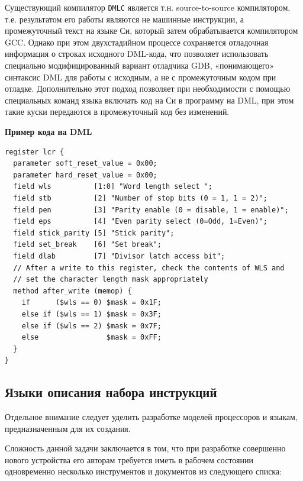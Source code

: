 Существующий компилятор \texttt{DMLC} является т.н. source-to-source компилятором, т.е. результатом его работы являются не машинные инструкции, а промежуточный текст на языке Си, который затем обрабатывается компилятором GCC. Однако при этом двухстадийном процессе сохраняется отладочная информация о строках исходного DML-кода, что позволяет использовать специально модифицированный вариант отладчика GDB, «понимающего» синтаксис DML для работы с исходным, а не с промежуточным кодом при отладке. Дополнительно этот подход позволяет при необходимости с помощью специальных команд языка включать код на Си в программу на DML, при этом такие куски передаются в промежуточный код без изменений.

\textbf{Пример кода на DML} %

\begin{lstlisting}
register lcr { 
  parameter soft_reset_value = 0x00; 
  parameter hard_reset_value = 0x00; 
  field wls          [1:0] "Word length select "; 
  field stb          [2] "Number of stop bits (0 = 1, 1 = 2)"; 
  field pen          [3] "Parity enable (0 = disable, 1 = enable)"; 
  field eps          [4] "Even parity select (0=Odd, 1=Even)"; 
  field stick_parity [5] "Stick parity"; 
  field set_break    [6] "Set break"; 
  field dlab         [7] "Divisor latch access bit"; 
  // After a write to this register, check the contents of WLS and  
  // set the character length mask appropriately 
  method after_write (memop) { 
    if      ($wls == 0) $mask = 0x1F; 
    else if ($wls == 1) $mask = 0x3F; 
    else if ($wls == 2) $mask = 0x7F; 
    else                $mask = 0xFF; 
  } 
}   
\end{lstlisting} 


\subsection{Языки описания набора инструкций}

Отдельное внимание следует уделить разработке моделей процессоров и языкам, предназначенным для их создания.

Сложность данной задачи заключается в том, что при разработке совершенно нового устройства его авторам требуется иметь в рабочем состоянии одновременно  несколько инструментов и документов из следующего списка:


